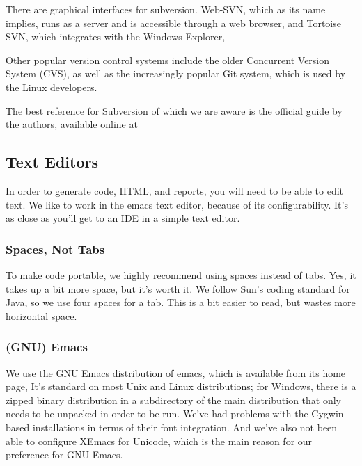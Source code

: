 There are graphical interfaces for subversion.  
Web-SVN, which as its name implies, runs as a server and is
accessible through a web browser, 
%
%
and Tortoise SVN, which integrates with the Windows Explorer,
%

Other popular version control systems include the older Concurrent
Version System (CVS), as well as the increasingly popular Git system,
which is used by the Linux developers.

The best reference for Subversion of which we are aware is the
official guide by the authors, available online at 
%


\subsection{Text Editors}

In order to generate code, HTML, and reports, you will need to be able
to edit text.  We like to work in the emacs text editor, because of
its configurability.  It's as close as you'll get to an IDE in a
simple text editor. 

\subsubsection{Spaces, Not Tabs}

To make code portable, we highly recommend using spaces instead of
tabs.  Yes, it takes up a bit more space, but it's worth it.  We
follow Sun's coding standard for Java, so we use four spaces for a
tab.  This is a bit easier to read, but wastes more horizontal space.

\subsubsection{(GNU) Emacs}

We use the GNU Emacs distribution of emacs, which is available from
its home page,
%
%
It's standard on most Unix and Linux distributions; for Windows, there
is a zipped binary distribution in a subdirectory of the main
distribution that only needs to be unpacked in order to be run.  We've
had problems with the Cygwin-based installations in terms of their
font integration.  And we've also not been able to configure XEmacs
for Unicode, which is the main reason for our preference for GNU Emacs.

